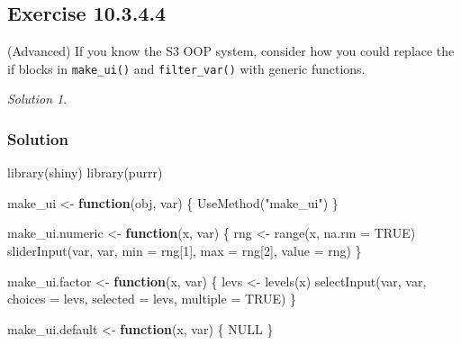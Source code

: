 \documentclass[
]{book}
\newenvironment{Shaded}{\begin{snugshade}}{\end{snugshade}}
\newcommand{\AttributeTok}[1]{\textcolor[rgb]{0.77,0.63,0.00}{#1}}
\newcommand{\ConstantTok}[1]{\textcolor[rgb]{0.00,0.00,0.00}{#1}}
\newcommand{\ControlFlowTok}[1]{\textcolor[rgb]{0.13,0.29,0.53}{\textbf{#1}}}
\newcommand{\DecValTok}[1]{\textcolor[rgb]{0.00,0.00,0.81}{#1}}
\newcommand{\FunctionTok}[1]{\textcolor[rgb]{0.00,0.00,0.00}{#1}}
\newcommand{\NormalTok}[1]{#1}
\newcommand{\OtherTok}[1]{\textcolor[rgb]{0.56,0.35,0.01}{#1}}
\newcommand{\StringTok}[1]{\textcolor[rgb]{0.31,0.60,0.02}{#1}}
\theoremstyle{definition}
\theoremstyle{definition}
\theoremstyle{definition}
\theoremstyle{definition}
\theoremstyle{remark}
\newtheorem*{solution}{Solution}
\begin{document}
\hypertarget{exercise-10.3.4.4}{%
\subsection*{Exercise 10.3.4.4}\label{exercise-10.3.4.4}}

(Advanced) If you know the S3 OOP system, consider how you could replace the if blocks in \texttt{make\_ui()} and \texttt{filter\_var()} with generic functions.

\begin{solution}
\leavevmode

\hypertarget{solution-39}{%
\subsubsection*{Solution}\label{solution-39}}

\begin{Shaded}
\begin{Highlighting}[]
\FunctionTok{library}\NormalTok{(shiny)}
\FunctionTok{library}\NormalTok{(purrr)}

\NormalTok{make\_ui }\OtherTok{\textless{}{-}} \ControlFlowTok{function}\NormalTok{(obj, var) \{ }\FunctionTok{UseMethod}\NormalTok{(}\StringTok{"make\_ui"}\NormalTok{) \}}

\NormalTok{make\_ui.numeric }\OtherTok{\textless{}{-}} \ControlFlowTok{function}\NormalTok{(x, var) \{}
\NormalTok{  rng }\OtherTok{\textless{}{-}} \FunctionTok{range}\NormalTok{(x, }\AttributeTok{na.rm =} \ConstantTok{TRUE}\NormalTok{)}
  \FunctionTok{sliderInput}\NormalTok{(var, var, }\AttributeTok{min =}\NormalTok{ rng[}\DecValTok{1}\NormalTok{], }\AttributeTok{max =}\NormalTok{ rng[}\DecValTok{2}\NormalTok{], }\AttributeTok{value =}\NormalTok{ rng)}
\NormalTok{\}}

\NormalTok{make\_ui.factor }\OtherTok{\textless{}{-}} \ControlFlowTok{function}\NormalTok{(x, var) \{ }
\NormalTok{  levs }\OtherTok{\textless{}{-}} \FunctionTok{levels}\NormalTok{(x) }
  \FunctionTok{selectInput}\NormalTok{(var, var, }\AttributeTok{choices =}\NormalTok{ levs, }\AttributeTok{selected =}\NormalTok{ levs, }\AttributeTok{multiple =} \ConstantTok{TRUE}\NormalTok{)}
\NormalTok{\}}

\NormalTok{make\_ui.default }\OtherTok{\textless{}{-}} \ControlFlowTok{function}\NormalTok{(x, var) \{ }\ConstantTok{NULL}\NormalTok{ \}}


\end{Highlighting}
\end{Shaded}
\end{solution}
\end{document}

